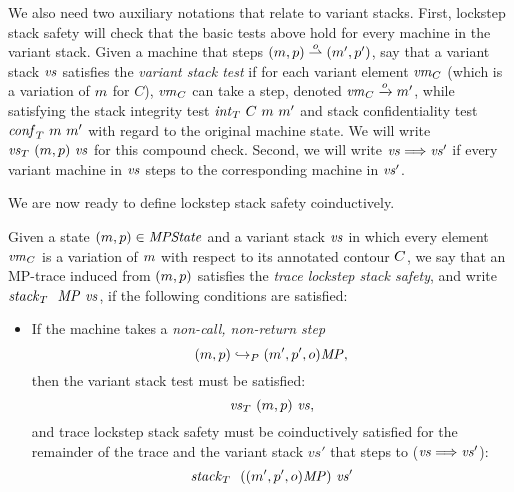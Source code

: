 \documentclass[acmsmall,review,anonymous]{acmart}\settopmatter{printfolios=true,printccs=false,printacmref=false}
\begin{document}
{%

We also need two auxiliary notations that relate to variant stacks.
%
First, lockstep stack safety will check that the basic tests above hold for every
machine in the variant stack.  Given a machine that steps $(m,
p) \overset{o}{\rightharpoonup} (m', p')$, say that a variant
stack $\mathit{vs}$ satisfies the \emph{variant stack test} if for each
variant element $\mathit{vm}_{C}$ (which is a variation of $m$ for $C$),
$\mathit{vm}_{C}$ can take a step, denoted $\mathit{vm}_{C} \xrightarrow{o} m'$,
while satisfying the stack integrity test $\mathit{int}_T ~ C ~ m ~ m'$
and stack confidentiality test $\mathit{conf}_T ~ m ~ m'$ with regard
to the original machine state. We will write $\mathit{\mathit{vs}}_T ~ (m,
  p) ~ \mathit{vs}$ for this compound check.
%
Second, we will write $\mathit{vs} \Longrightarrow \mathit{vs}'$ if every variant machine
in $\mathit{vs}$ steps to the corresponding machine in $\mathit{vs}'$.
%

We are now ready to define lockstep stack safety coinductively.

 Given a state $(m, p) \in \mathit{MPState}$ and a variant stack
$\mathit{vs}$ in which every element $\mathit{vm}_{C}$ is a variation of $m$
with respect to its annotated contour $C$, we say that an
MP-trace induced from $(m, p)$ satisfies the \emph{trace
  lockstep stack safety}, and write $\mathit{stack}_T ~  ~ \mathit{MP} ~ \mathit{vs}$, if the
following conditions are satisfied:

\begin{itemize}

\item
  If the machine takes a \emph{non-call, non-return step}
  \[(m, p) \hookrightarrow_P (m', p', o)\mathit{MP},\]
  then the variant stack test must be satisfied:
  \[\mathit{\mathit{vs}}_T ~ (m, p) ~ \mathit{vs},\]
  and trace lockstep stack safety must be coinductively satisfied for
  the remainder of the trace and the variant stack $vs'$ that
  steps to ($\mathit{vs} \Longrightarrow \mathit{vs}'$):
  \[ \mathit{stack}_T ~  ~ ((m',p',o)\mathit{MP}) ~ \mathit{vs}'\]


\end{itemize}}
\end{document}
